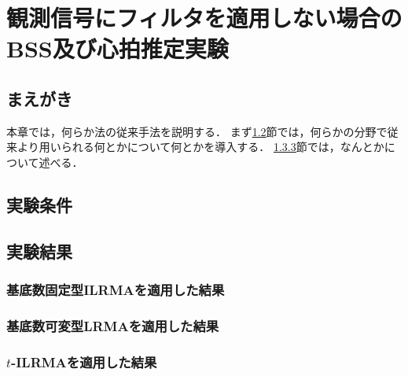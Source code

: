 \chapter{観測信号にフィルタを適用しない場合のBSS及び心拍推定実験}
\label{chap:conv}

\section{まえがき}
本章では，何らか法の従来手法を説明する．
まず\ref{sec:conv:something}節では，何らかの分野で従来より用いられる何とかについて何とかを導入する．
\ref{sec:conv:somewhat}節では，なんとかについて述べる．

\section{実験条件}
\label{sec:conv:something}

\section{実験結果}
\label{sec:conv:somewhat}

\subsection{基底数固定型ILRMAを適用した結果}
\label{sec:conv:somewhat}

\subsection{基底数可変型LRMAを適用した結果}
\label{sec:conv:somewhat}

\subsection{$t$-ILRMAを適用した結果}
\label{sec:conv:somewhat}


